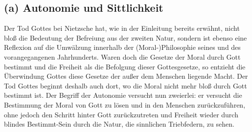 \documentclass[12pt, a4paper, openany]{report}
\begin{document}
\subsection{(a) Autonomie und Sittlichkeit}
Der Tod Gottes bei Nietzsche hat, wie in der Einleitung bereits erwähnt, nicht bloß die Bedeutung der Befreiung aus der zweiten Natur, sondern ist ebenso eine Reflexion auf die Umwälzung innerhalb der (Moral-)Philosophie seines und des vorangegangenen Jahrhunderts. 
Waren doch die Gesetze der Moral durch Gott bestimmt und die Freiheit als die Befolgung dieser Gottesgesetze, so entzieht die Überwindung Gottes diese Gesetze der außer dem Menschen liegende Macht. 
Der Tod Gottes beginnt deshalb auch dort, wo die Moral nicht mehr bloß durch Gott bestimmt ist. 
Der Begriff der Autonomie versucht nun zweierlei: 
er versucht die Bestimmung der Moral von Gott zu lösen und in den Menschen zurückzuführen, ohne jedoch den Schritt hinter Gott zurückzutreten und Freiheit wieder durch blindes Bestimmt-Sein durch die Natur, die sinnlichen Triebfedern, zu sehen. 
\end{document}
